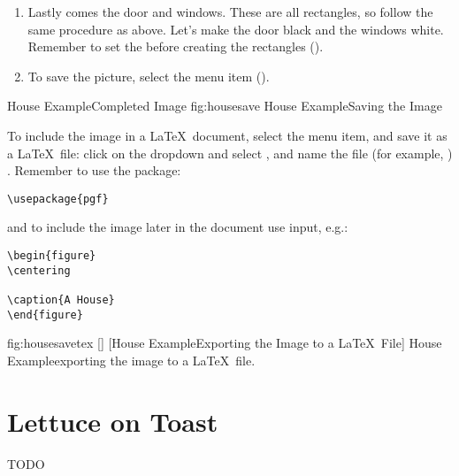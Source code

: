 \begin{enumerate}
[]
{
 {fig:house2a}{}{},
 {fig:house2b}{}{}
}
[House Example\dash Creating a Triangle]
{House Example\dash creating a triangle:
 triangle under construction,
 completed triangle.}

\item Lastly comes the door and windows. These are all
rectangles, so follow the same procedure as above.
Let's make the door black and the windows white.
Remember to set the  before creating the rectangles
().

\item To save the picture, select the 
menu item ().

\end{enumerate}

{}
{House Example\dash Completed Image}
{fig:housesave}
{}
{House Example\dash Saving the Image}

To include the image in a \LaTeX\ document, select the
 menu item, and save it as a
\LaTeX\ file: click on the  \gls{dropdown} and
select , and name the file
(for example, )
. Remember to use the  package:
\begin{verbatim}
\usepackage{pgf}
\end{verbatim}
and to include the image later in the document use \gls{input}, e.g.:
\begin{verbatim}
\begin{figure}
\centering

\caption{A House}
\end{figure}
\end{verbatim}

\FloatFig
{fig:housesavetex}
[]
{}
[House Example\dash Exporting the Image to a \LaTeX\ File]
{House Example\dash exporting the image to a \LaTeX\ file.}


\section{Lettuce on Toast}\label{sec:toastexample}

TODO


